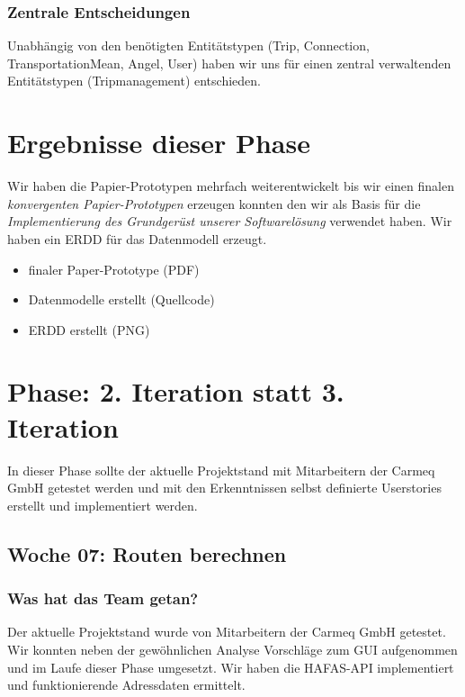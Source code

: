 \documentclass{article}
\begin{document}
\subsubsection{Zentrale Entscheidungen}

Unabh\"angig von den ben\"otigten Entit\"atstypen (Trip, Connection, TransportationMean, Angel, User) haben wir uns f\"ur einen zentral verwaltenden Entit\"atstypen (Tripmanagement) entschieden.

\section*{Ergebnisse dieser Phase}

Wir haben die Papier-Prototypen mehrfach weiterentwickelt bis wir einen finalen \textit{konvergenten Papier-Prototypen} erzeugen konnten den wir als Basis f\"ur die \textit{Implementierung des Grundger\"ust unserer Softwarel\"osung} verwendet haben. Wir haben ein ERDD f\"ur das Datenmodell erzeugt.

\begin{itemize}
\item finaler Paper-Prototype (PDF)
\item Datenmodelle erstellt (Quellcode)
\item ERDD erstellt (PNG)
\end{itemize}

\section{Phase: 2. Iteration statt 3. Iteration}

In dieser Phase sollte der aktuelle Projektstand mit Mitarbeitern der Carmeq GmbH getestet werden und mit den Erkenntnissen selbst definierte Userstories erstellt und implementiert werden.

\subsection{Woche 07: Routen berechnen}

\subsubsection{Was hat das Team getan?}

Der aktuelle Projektstand wurde von Mitarbeitern der Carmeq GmbH getestet. Wir konnten neben der gew\"ohnlichen Analyse Vorschl\"age zum GUI aufgenommen und im Laufe dieser Phase umgesetzt. Wir haben die HAFAS-API implementiert und funktionierende Adressdaten ermittelt.
\end{document}
